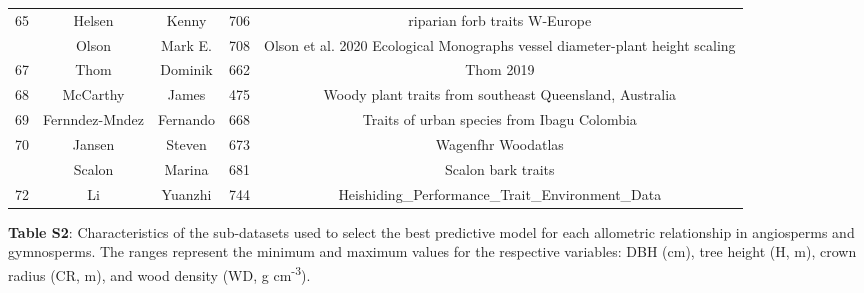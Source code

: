 \documentclass[
  12pt,
  letterpaper,
  DIV=11,
  numbers=noendperiod]{scrartcl}
\begin{document}
\begin{longtable*}[t]{ccccc}
65 & Helsen & Kenny & 706 & riparian forb traits W-Europe\\
 & Olson & Mark E. & 708 & Olson et al. 2020 Ecological Monographs vessel diameter-plant height scaling\\
67 & Thom & Dominik & 662 & Thom 2019\\
68 & McCarthy & James & 475 & Woody plant traits from southeast Queensland, Australia\\
69 & Fernndez-Mndez & Fernando & 668 & Traits of urban species from Ibagu Colombia\\
70 & Jansen & Steven & 673 & Wagenfhr Woodatlas\\
 & Scalon & Marina & 681 & Scalon bark traits\\
72 & Li & Yuanzhi & 744 & Heishiding\_Performance\_Trait\_Environment\_Data\\
\bottomrule
\end{longtable*}
\endgroup{}

\newpage

\textbf{Table S2}: Characteristics of the sub-datasets used to select
the best predictive model for each allometric relationship in
angiosperms and gymnosperms. The ranges represent the minimum and
maximum values for the respective variables: DBH (cm), tree height (H,
m), crown radius (CR, m), and wood density (WD, g
cm\textsuperscript{-3}).

\begingroup\fontsize{10}{12}\selectfont
\end{document}

